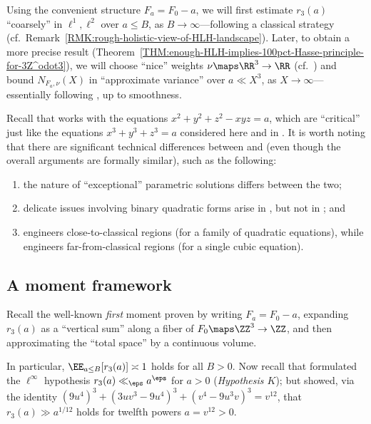 \documentclass[12pt]{report}
\begin{document}
Using the convenient structure $F_a = F_0-a$,
we will first estimate $r_3(a)$ ``coarsely'' in $\ell^1,\ell^2$ over $a\leq B$,
as $B\to\infty$---following a classical strategy (cf.~Remark~\ref{RMK:rough-holistic-view-of-HLH-landscape}).
Later, to obtain a more precise result (Theorem~\ref{THM:enough-HLH-implies-100pct-Hasse-principle-for-3Z^odot3}),
we will choose ``nice'' weights $\nu\maps\RR^3\to\RR$ (cf.~\cite{hooley2016representation})
and bound $N_{F_a,\nu}(X)$ in ``approximate variance'' over $a\ll X^3$,
as $X\to\infty$---essentially following \cites{ghosh2017integral,diaconu2019admissible},
up to smoothness.

Recall that \cite{ghosh2017integral} works with the equations $x^2+y^2+z^2-xyz = a$, which are ``critical'' just like the equations $x^3+y^3+z^3 = a$ considered here and in \cite{diaconu2019admissible}.
It is worth noting that there are significant technical differences between \cite{ghosh2017integral} and \cite{diaconu2019admissible} (even though the overall arguments are formally similar), such as the following:
\begin{enumerate}[(1)]
    \item the nature of ``exceptional'' parametric solutions differs between the two;
    \item delicate issues involving binary quadratic forms arise in \cite{ghosh2017integral}, but not in \cite{diaconu2019admissible};
    and
    \item \cite{ghosh2017integral} engineers close-to-classical regions (for a family of quadratic equations), while \cite{diaconu2019admissible} engineers far-from-classical regions (for a single cubic equation).
\end{enumerate}

\subsection{A moment framework}
\label{SEC:a-moment-framework}

Recall the well-known \emph{first} moment
proven by writing $F_a=F_0-a$,
expanding $r_3(a)$ as a ``vertical sum'' along a fiber of $F_0\maps\ZZ^3\to\ZZ$,
and then approximating the ``total space'' by a continuous volume.

In particular, $\EE_{a\leq B}[r_3(a)]\asymp 1$ holds for all $B>0$.
Now recall that \cite{hardy1925some} formulated the $\ell^\infty$ hypothesis $r_3(a)\ll_\eps a^\eps$ for $a>0$ (\emph{Hypothesis $K$});
but \cite{mahler1936note} showed,
via the identity $(9u^4)^3 + (3uv^3-9u^4)^3 + (v^4-9u^3v)^3 = v^{12}$,
that $r_3(a)\gg a^{1/12}$ holds for twelfth powers $a=v^{12}>0$.
\end{document}
